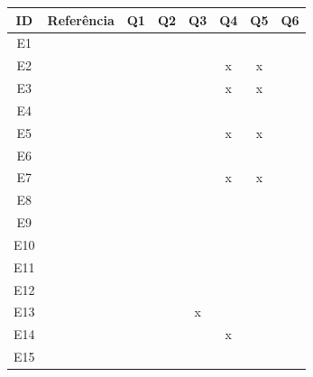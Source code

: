 \begin{table}[H]
	\centering
	\label{tab:triagem}
	\begin{tabular}{|c|c|c|c|c|c|c|c|}
		\hline
		\textbf{ID} & \textbf{Referência} & \textbf{Q1} & \textbf{Q2} & \textbf{Q3} & \textbf{Q4} & \textbf{Q5} & \textbf{Q6} \\ \hline
		E1 & \cite{asbjornsen2022echange} & \checkmark & \checkmark & \checkmark & \checkmark & \checkmark & \checkmark \\ \hline
		E2 & \cite{dehmel2021weather} & \checkmark & \checkmark & \checkmark & x & x & \checkmark \\ \hline
		E3 & \cite{giraldo2024ecotourism} & \checkmark & \checkmark & \checkmark & x & x & \checkmark \\ \hline
		E4 & \cite{kumar2023rheumatology} & \checkmark & \checkmark & \checkmark & \checkmark & \checkmark & \checkmark \\ \hline
		E5 & \cite{lambe2022capabilities} & \checkmark & \checkmark & \checkmark & x & x & \checkmark \\ \hline
		E6 & \cite{lee2023industry} & \checkmark & \checkmark & \checkmark & \checkmark & \checkmark & \checkmark \\ \hline
		E7 & \cite{milton2021eatingdisorders} & \checkmark & \checkmark & \checkmark & x & x & \checkmark \\ \hline
		E8 & \cite{seko2024transitions} & \checkmark & \checkmark & \checkmark & \checkmark & \checkmark & \checkmark\\ \hline
		E9 & \cite{soto2023prototyping} & \checkmark & \checkmark & \checkmark & \checkmark & \checkmark & \checkmark\\ \hline
		E10 & \cite{villa2022integratedcare} & \checkmark & \checkmark & \checkmark & \checkmark & \checkmark & \checkmark \\ \hline
		E11 & \cite{wang2023smartproducts} & \checkmark & \checkmark & \checkmark & \checkmark & \checkmark & \checkmark \\ \hline
		E12 & \cite{yan2022pssvalue} & \checkmark & \checkmark & \checkmark & \checkmark & \checkmark & \checkmark\\ \hline
		E13 & \cite{Kim2024} & \checkmark & \checkmark & x & \checkmark & \checkmark & \checkmark\\ \hline
		E14 & \cite{Suryawati2024} & \checkmark & \checkmark & \checkmark & x & \checkmark & \checkmark\\ \hline
		E15 & \cite{hegemann2024palette} & \checkmark & \checkmark & \checkmark & \checkmark & \checkmark & \checkmark\\ \hline

\end{tabular}
\end{table}
